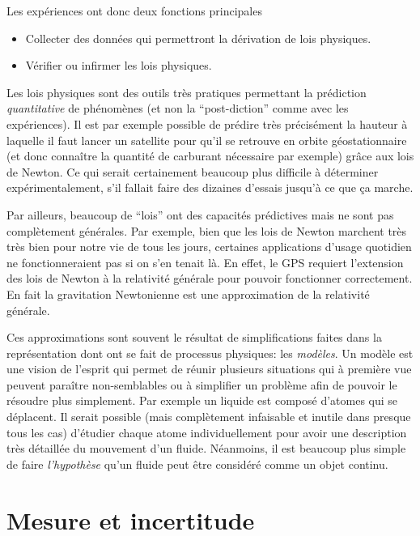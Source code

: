 \documentclass[a4paper,12pt]{book}
\begin{document}
Les expériences ont donc deux fonctions principales
\begin{itemize}
 \item Collecter des données qui permettront la dérivation de lois physiques.
 \item Vérifier ou infirmer les lois physiques.
\end{itemize}

Les lois physiques sont des outils très pratiques permettant la prédiction \textit{quantitative} 
de phénomènes (et non la ``post-diction'' comme avec les expériences). Il est par exemple possible de prédire très précisément la hauteur à laquelle il faut lancer un satellite 
pour qu'il se retrouve en orbite géostationnaire (et donc connaître la quantité de carburant nécessaire par exemple) grâce aux lois de Newton. 
Ce qui serait certainement beaucoup plus difficile à déterminer expérimentalement, s'il fallait faire des dizaines d'essais jusqu'à ce que ça marche.

Par ailleurs, beaucoup de ``lois'' ont des capacités prédictives mais ne sont pas complètement générales. Par exemple, bien que les lois de Newton 
marchent très très bien pour notre vie de tous les jours, certaines applications d'usage quotidien ne fonctionneraient pas si on s'en tenait là. 
En effet, le GPS requiert l'extension des lois de Newton à la relativité générale pour pouvoir fonctionner correctement. En fait
la gravitation Newtonienne est une approximation de la relativité générale.

Ces approximations sont souvent le résultat de simplifications faites dans la représentation dont ont se fait 
de processus physiques: les \textit{modèles}. Un modèle est une vision de l'esprit qui permet de réunir plusieurs
situations qui à première vue peuvent paraître non-semblables ou à simplifier un problème afin de pouvoir le résoudre plus simplement. 
Par exemple un liquide est composé d'atomes qui se déplacent. Il serait possible (mais complètement infaisable et inutile dans presque tous les cas) 
d'étudier chaque atome individuellement pour avoir une description très détaillée du mouvement d'un fluide. Néanmoins, il est beaucoup plus simple de 
faire \textit{l'hypothèse} qu'un fluide peut être considéré comme un objet continu.

\section{Mesure et incertitude}
\end{document}
